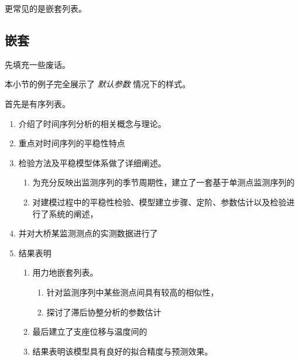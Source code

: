 \documentclass[../Main/thesis]{subfiles}
\begin{document}
更常见的是嵌套列表。

\subsection{嵌套}

先填充一些废话。\zhlipsum[6]

本小节的例子完全展示了 \emph{默认参数} 情况下的样式。

首先是有序列表。
\begin{enumerate}
  \item 介绍了时间序列分析的相关概念与理论。
  \item 重点对时间序列的平稳性特点
  \item 检验方法及平稳模型体系做了详细阐述。
  \begin{enumerate}
    \item 为充分反映出监测序列的季节周期性，建立了一套基于单测点监测序列的
    \item 对建模过程中的平稳性检验、模型建立步骤、定阶、参数估计以及检验进行了系统的阐述，
  \end{enumerate}
  \item 并对大桥某监测测点的实测数据进行了
  \item 结果表明
  \begin{enumerate}
    \item 用力地嵌套列表。
    \begin{enumerate}
      \item 针对监测序列中某些测点间具有较高的相似性，
      \item 探讨了滞后协整分析的参数估计
    \end{enumerate}
    \item 最后建立了支座位移与温度间的
    \item 结果表明该模型具有良好的拟合精度与预测效果。
  \end{enumerate}
\end{enumerate}
\end{document}
